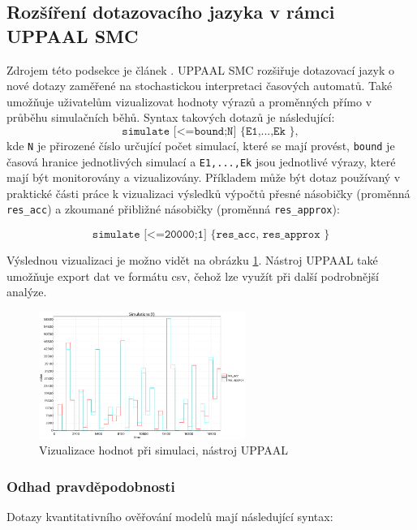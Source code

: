 \subsection{Rozšíření dotazovacího jazyka v rámci UPPAAL SMC} \label{uppaal_smc_queries}
Zdrojem této podsekce je článek \cite{uppaal_smc}. UPPAAL SMC rozšiřuje dotazovací jazyk o nové dotazy zaměřené na stochastickou interpretaci časových automatů. Také umožňuje uživatelům vizualizovat hodnoty výrazů a proměnných přímo v průběhu simulačních běhů. Syntax takových dotazů je následující:
\begin{equation*}
    \texttt{simulate [<=bound;N] \{ E1,...,Ek \}},
\end{equation*}
kde \texttt{N} je přirozené číslo určující počet simulací, které se mají provést, \texttt{bound} je časová hranice jednotlivých simulací a \texttt{E1,...,Ek} jsou jednotlivé výrazy, které mají být monitorovány a vizualizovány. Příkladem může být dotaz používaný v praktické části práce k vizualizaci výsledků výpočtů přesné násobičky (proměnná \texttt{res\_acc}) a zkoumané přibližné násobičky (proměnná \texttt{res\_approx}):

\begin{equation*}
    \texttt{simulate [<=20000;1] \{ res\_acc, res\_approx \}}
\end{equation*}

Výslednou vizualizaci je možno vidět na obrázku \ref{fig:simulate_example}. Nástroj UPPAAL také umožňuje export dat ve formátu csv, čehož lze využít při další podrobnější analýze.

\begin{figure}[H]
    \centering
    \includegraphics[width=0.6\textwidth]{obrazky-figures/simulate_example.png}
    \caption{Vizualizace hodnot při simulaci, nástroj UPPAAL}
    \label{fig:simulate_example}
\end{figure}

\subsubsection{Odhad pravděpodobnosti}
Dotazy kvantitativního ověřování modelů mají následující syntax:


